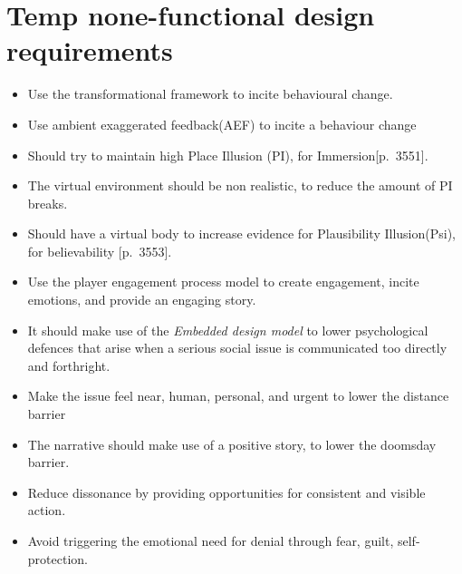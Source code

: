 \section{Temp none-functional design requirements}
\begin{itemize}
    \item Use the transformational framework to incite behavioural change.\cite{transformationalFramework}
    \item Use ambient exaggerated feedback(AEF) to incite a behaviour change \cite{waterConsumption}
    
    \item Should try to maintain high Place Illusion (PI), for Immersion\citep{vrImmersion}[p.~3551].
    \item The virtual environment should be non realistic, to reduce the amount of PI breaks.
    \item Should have a virtual body to increase evidence for Plausibility Illusion(Psi), for believability \citep{vrImmersion}[p.~3553].

    \item Use the player engagement process model to create engagement, incite emotions, and provide an engaging story\cite{playerEngagement}.
    
    \item It should make use of the \textit{Embedded design model} to lower psychological defences that arise when a serious social issue is communicated too directly and forthright\cite{embeddedDesignModel}.
    
    \item Make the issue feel near, human, personal, and urgent to lower the distance barrier %
    \item The narrative should make use of a positive story, to lower the doomsday barrier. %
    \item Reduce dissonance by providing opportunities for consistent and visible action. %
    \item Avoid triggering the emotional need for denial through fear, guilt, self-protection\cite{the5Ds}. %
    
\end{itemize}
